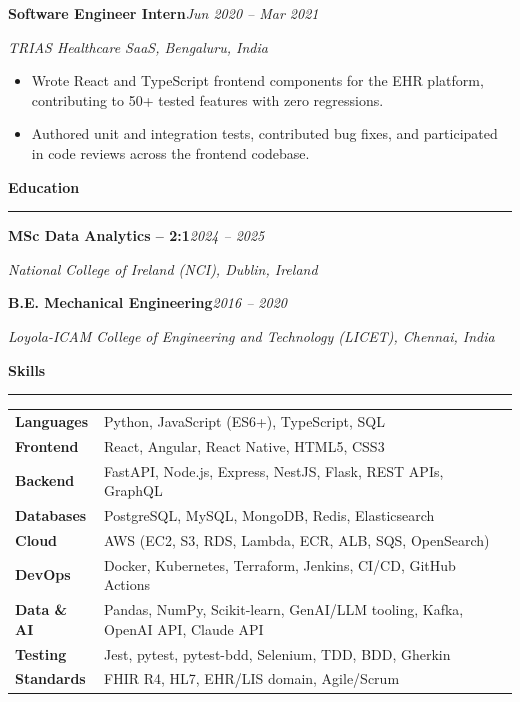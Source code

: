 \documentclass[10pt,letterpaper]{article}
\newcommand{\ressection}[1]{%
  \vspace{4pt}%
  {\large\textbf{#1}}\\[-5pt]%
  \rule{\linewidth}{0.5pt}\par%
  \vspace{2pt}%
}
\newcommand{\jobtitle}[2]{%
  \vspace{3pt}%
  \noindent\textbf{#1}\hfill\textit{#2}\par%
}
\newcommand{\companyline}[1]{%
  \noindent\textit{#1}\par%
  \vspace{1pt}%
}
\begin{document}
\vspace{2pt}

\jobtitle{Software Engineer Intern}{Jun 2020 -- Mar 2021}
\companyline{TRIAS Healthcare SaaS, Bengaluru, India}
\begin{itemize}[leftmargin=12pt, label=\textbullet, itemsep=1pt, topsep=0pt, parsep=0pt]
  \item Wrote React and TypeScript frontend components for the EHR platform, contributing to 50+ tested features with zero regressions.
  \item Authored unit and integration tests, contributed bug fixes, and participated in code reviews across the frontend codebase.
\end{itemize}

\ressection{Education}

\jobtitle{MSc Data Analytics -- 2:1}{2024 -- 2025}
\companyline{National College of Ireland (NCI), Dublin, Ireland}
\vspace{2pt}
\jobtitle{B.E. Mechanical Engineering}{2016 -- 2020}
\companyline{Loyola-ICAM College of Engineering and Technology (LICET), Chennai, India}

\ressection{Skills}
\begin{tabularx}{\linewidth}{@{} >{\bfseries}p{1.55in} X @{}}
  Languages     & Python, JavaScript (ES6+), TypeScript, SQL \\[1pt]
  Frontend      & React, Angular, React Native, HTML5, CSS3 \\[1pt]
  Backend       & FastAPI, Node.js, Express, NestJS, Flask, REST APIs, GraphQL \\[1pt]
  Databases     & PostgreSQL, MySQL, MongoDB, Redis, Elasticsearch \\[1pt]
  Cloud         & AWS (EC2, S3, RDS, Lambda, ECR, ALB, SQS, OpenSearch) \\[1pt]
  DevOps        & Docker, Kubernetes, Terraform, Jenkins, CI/CD, GitHub Actions \\[1pt]
  Data \& AI    & Pandas, NumPy, Scikit-learn, GenAI/LLM tooling, Kafka, OpenAI API, Claude API \\[1pt]
  Testing       & Jest, pytest, pytest-bdd, Selenium, TDD, BDD, Gherkin \\[1pt]
  Standards     & FHIR R4, HL7, EHR/LIS domain, Agile/Scrum \\[1pt]
\end{tabularx}
\end{document}
